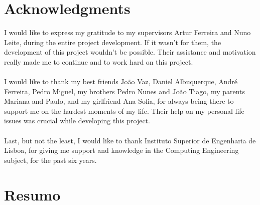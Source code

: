 \chapter*{Acknowledgments}

I would like to express my gratitude to my supervisors Artur Ferreira and Nuno Leite, during the entire project development. If it wasn't for them, the development of this project wouldn't be possible. Their assistance and motivation really made me to continue and to work hard on this project.\\
\\
I would like to thank my best friends João Vaz, Daniel Albuquerque, André Ferreira, Pedro Miguel, my brothers Pedro Nunes and João Tiago, my parents Mariana and Paulo, and my girlfriend Ana Sofia, for always being there to support me on the hardest moments of my life. Their help on my personal life issues was crucial while developing this project.\\
\\
Last, but not the least, I would like to thank Instituto Superior de Engenharia de Lisboa, for giving me support and knowledge in the Computing Engineering subject, for the past six years.
\
\chapter*{Resumo}

